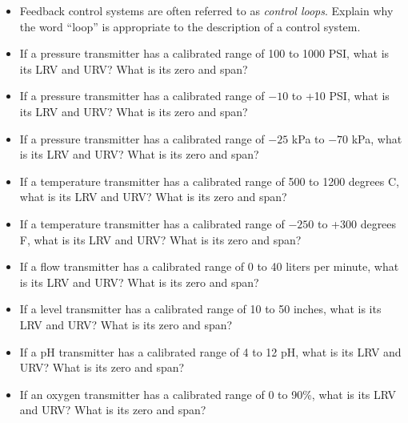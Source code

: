 \begin{itemize}
\item{} Feedback control systems are often referred to as {\it control loops}.  Explain why the word ``loop'' is appropriate to the description of a control system.
\item{} If a pressure transmitter has a calibrated range of 100 to 1000 PSI, what is its LRV and URV?  What is its zero and span?
\item{} If a pressure transmitter has a calibrated range of $-10$ to +10 PSI, what is its LRV and URV?  What is its zero and span?
\item{} If a pressure transmitter has a calibrated range of $-25$ kPa to $-70$ kPa, what is its LRV and URV?  What is its zero and span?
\item{} If a temperature transmitter has a calibrated range of 500 to 1200 degrees C, what is its LRV and URV?  What is its zero and span?
\item{} If a temperature transmitter has a calibrated range of $-250$ to +300 degrees F, what is its LRV and URV?  What is its zero and span?
\item{} If a flow transmitter has a calibrated range of 0 to 40 liters per minute, what is its LRV and URV?  What is its zero and span?
\item{} If a level transmitter has a calibrated range of 10 to 50 inches, what is its LRV and URV?  What is its zero and span?
\item{} If a pH transmitter has a calibrated range of 4 to 12 pH, what is its LRV and URV?  What is its zero and span?
\item{} If an oxygen transmitter has a calibrated range of 0 to 90\%, what is its LRV and URV?  What is its zero and span?
\end{itemize}








